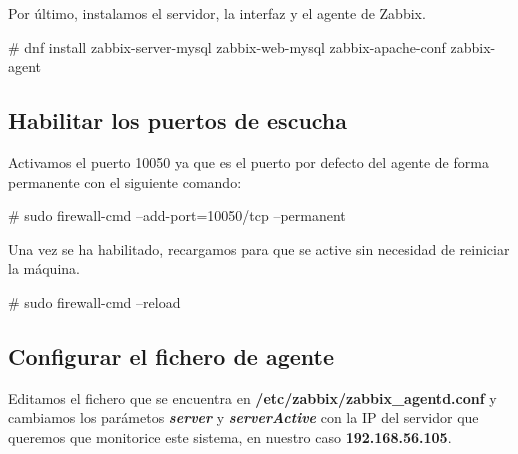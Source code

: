     Por último, instalamos el servidor, la interfaz y el agente de Zabbix.
        \begin{tcolorbox}[colback=black!10, halign=left]
            \# dnf install zabbix-server-mysql zabbix-web-mysql zabbix-apache-conf zabbix-agent
        \end{tcolorbox}

    \subsection{Habilitar los puertos de escucha}
    Activamos el puerto 10050 ya que es el puerto por defecto del agente de forma permanente con el siguiente comando: 
        \begin{tcolorbox}[colback=black!10, halign=left]
            \# sudo firewall-cmd --add-port=10050/tcp --permanent
        \end{tcolorbox}

    Una vez se ha habilitado, recargamos para que se active sin necesidad de reiniciar la máquina.
    \begin{tcolorbox}[colback=black!10, halign=left]
        \# sudo firewall-cmd --reload
    \end{tcolorbox}
    
    \subsection{Configurar el fichero de agente}
    Editamos el fichero que se encuentra en \textbf{/etc/zabbix/zabbix\_agentd.conf} y cambiamos los parámetos \textbf{\emph{server}} y \textbf{\emph{serverActive}}
    con la IP del servidor que queremos que monitorice este sistema, en nuestro caso \textbf{192.168.56.105}. 

